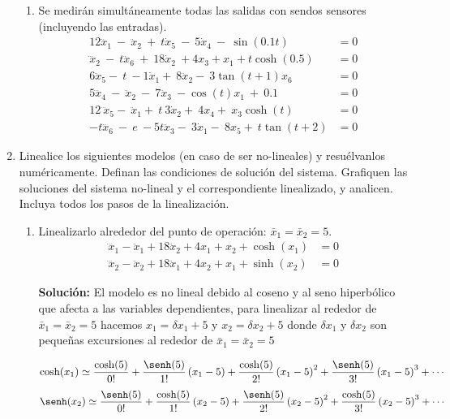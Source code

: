 \documentclass[letterpaper, 12pt]{article}
\begin{document}
\begin{enumerate}
\begin{enumerate}
\item Se medirán simultáneamente todas las salidas con sendos sensores (incluyendo las entradas).
\begin{equation}
\begin{split}
    12{\dddot{x}}_1\ -\ {\ddot{x}}_2\ +\ t{\dot{x}}_5\ -\ 5{\dot{x}}_4\ -\ \sin(0.1t) &=0 \\
    \dddot{x}_2\ -\ t\ddot{x}_6\ +\ 18\dot{x}_2\ + 4x_3 + x_1 + t \cosh(0.5) &= 0 \\
    6{\ddot{x}}_5-\ t\ -1{\dot{x}}_1+\ 8{\ddot{x}}_2-\ 3\tan(t + 1)x_6 &= 0\\
    5{\dddot{x}}_4\ -\ {\ddot{x}}_2\ -\ 7{\ddot{x}}_3\ -\cos(t)x_1\ +\ 0.1 &= 0 \\ 
    12{\dddot{\ x}}_5-\ {\ddot{x}}_1+\ t\ 3{\dot{x}}_2+\ 4x_4+\ x_3\cosh(t) &=0 \\
    -t{\dddot{x}}_6\ -\ e\ -5t{\ddot{x}}_3-\ 3{\dot{x}}_1-\ 8x_5+\ t\tan(t + 2) &= 0
\end{split}
\end{equation}



\end{enumerate}
\item Linealice los siguientes modelos (en caso de ser no-lineales) y resuélvanlos numéricamente. Definan las condiciones de solución del sistema. Grafiquen las soluciones del sistema no-lineal y el
correspondiente linealizado, y analicen. Incluya todos los pasos de la linealización. 
\begin{enumerate}
\item Linealizarlo alrededor del punto de operación: $\bar{x}_1=\bar{x}_2=5$.
\begin{equation}
\begin{split}
    \dddot{x}_1-\ddot{x}_1+18\ddot{x}_2+4x_1+x_2+\cosh(x_1) &= 0 \\ \dddot{x}_2-\ddot{x}_2+18\ddot{x}_1+4x_2+x_1+\sinh(x_2) &= 0
\end{split}
\label{mod1}
\end{equation}

\textbf{Solución:}
El modelo es no lineal debido al coseno y al seno hiperbólico que afecta a las variables dependientes, para linealizar al rededor de $\bar{x}_1=\bar{x}_2=5$ hacemos $x_1=\delta x_1+5$ y $x_2=\delta x_2+5$ donde $\delta x_1$ y $\delta x_2$ son pequeñas excursiones al rededor de $\bar{x}_1=\bar{x}_2=5$

\begin{equation}
    \notag
    \cosh(x_1)\simeq \frac{\cosh(5)}{0!}+\frac{\senh(5)}{1!}\left(x_1-5\right)+\frac{\cosh(5)}{2!}\left(x_1-5\right)^2+\frac{\senh(5)}{3!}\left(x_1-5\right)^3+ \cdots
\end{equation}
\begin{equation}
    \notag
    \senh(x_2)\simeq \frac{\senh(5)}{0!}+\frac{\cosh(5)}{1!}\left(x_2-5\right)+\frac{\senh(5)}{2!}\left(x_2-5\right)^2+\frac{\cosh(5)}{3!}\left(x_2-5\right)^3+ \cdots
\end{equation}


\end{enumerate}
\end{enumerate}
\end{document}
